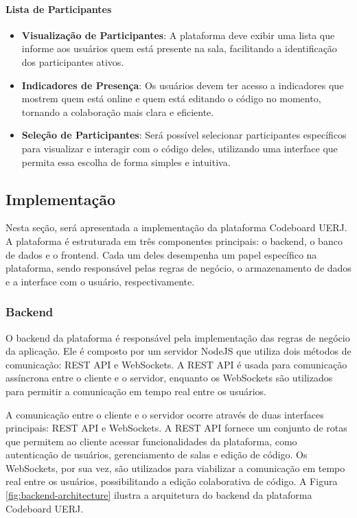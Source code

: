 \paragraph{Lista de Participantes}

\begin{itemize}
    \item \textbf{Visualização de Participantes}: A plataforma deve exibir uma lista que informe aos usuários quem está presente na sala, facilitando a identificação dos participantes ativos.
    \item \textbf{Indicadores de Presença}: Os usuários devem ter acesso a indicadores que mostrem quem está online e quem está editando o código no momento, tornando a colaboração mais clara e eficiente.
    \item \textbf{Seleção de Participantes}: Será possível selecionar participantes específicos para visualizar e interagir com o código deles, utilizando uma interface que permita essa escolha de forma simples e intuitiva.
\end{itemize}


\subsection{Implementação}

Nesta seção, será apresentada a implementação da plataforma Codeboard UERJ. A plataforma é estruturada em três componentes principais: o backend, o banco de dados e o frontend. Cada um deles desempenha um papel específico na plataforma, sendo responsável pelas regras de negócio, o armazenamento de dados e a interface com o usuário, respectivamente.

\subsubsection{Backend}

O backend da plataforma é responsável pela implementação das regras de negócio da aplicação. Ele é composto por um servidor NodeJS que utiliza dois métodos de comunicação: REST API e WebSockets. A REST API é usada para comunicação assíncrona entre o cliente e o servidor, enquanto os WebSockets são utilizados para permitir a comunicação em tempo real entre os usuários.

A comunicação entre o cliente e o servidor ocorre através de duas interfaces principais: REST API e WebSockets. A REST API fornece um conjunto de rotas que permitem ao cliente acessar funcionalidades da plataforma, como autenticação de usuários, gerenciamento de salas e edição de código. Os WebSockets, por sua vez, são utilizados para viabilizar a comunicação em tempo real entre os usuários, possibilitando a edição colaborativa de código. A Figura \ref{fig:backend-architecture} ilustra a arquitetura do backend da plataforma Codeboard UERJ.

